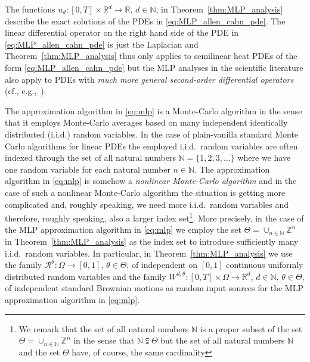 \documentclass[12pt,AutoFakeBold,AutoFakeSlant]{article}
\theoremstyle{definition}
\newcommand{\R}{\mathbb{R}}
\newcommand{\Z}{\mathbb{Z}}
\newcommand{\N}{\mathbb{N}}
\begin{document}
	The functions $ u_d \colon [0,T] \times \R^d \to \R $, $ d \in \N $, 
	in Theorem~\ref{thm:MLP_analysis} 
	describe the exact solutions of the PDEs in \eqref{eq:MLP_allen_cahn_pde}. 
	The linear differential operator on the 
	right hand side of the PDE in 
	\eqref{eq:MLP_allen_cahn_pde} 
	is just the Laplacian and 
	Theorem~\ref{thm:MLP_analysis} thus only applies to 
	semilinear heat PDEs of the form \eqref{eq:MLP_allen_cahn_pde} 
	but the MLP analyses in the scientific literature 
	also apply to PDEs with 
	\emph{much more general second-order differential operators} 
	(cf., e.g.,~\cite{hutzenthaler2020lipschitz,
	hutzenthaler2019arxiv1903}). 



	The approximation algorithm in \eqref{eq:mlp} is a Monte-Carlo algorithm in the sense 
	that it employs Monte-Carlo averages based on many independent identically distributed (i.i.d.) 
	random variables. In the case of plain-vanilla standard Monte Carlo algorithms 
	for linear PDEs the employed i.i.d.\ random variables are often indexed 
	through the set of all natural numbers $ \N = \{ 1, 2, 3, \dots \} $ 
	where we have one random variable for each natural number $ n \in \N $. 
	The approximation algorithm in \eqref{eq:mlp} is somehow a \emph{nonlinear Monte-Carlo algorithm} 
	and in the case of such a nonlinear Monte-Carlo algorithm the situation is getting more 
	complicated and, roughly speaking, we need more i.i.d.\ random variables and 
	therefore, roughly speaking, also a larger index set\footnote{We remark that the set of all natural numbers $ \N $ 
	is a proper subset of the set $ \Theta = \cup_{ n \in \N } \Z^n $ in the sense that $ \N \subsetneqq \Theta $ but 
	the set of all natural numbers $ \N $ 
	and the set $ \Theta $ have, of course, the same cardinality}. More precisely, 
	in the case of the MLP approximation algorithm in \eqref{eq:mlp} we employ the 
	set $ \Theta = \cup_{ n \in \N } \Z^n $ in Theorem~\ref{thm:MLP_analysis} 
	as the index set to introduce sufficiently many i.i.d.\ random variables. 
	In particular, in Theorem~\ref{thm:MLP_analysis} we use 
	the family $ \mathcal{R}^{ \theta } \colon \Omega \to [0,1] $,
	$ \theta \in \Theta $, of independent 
	on $ [0,1] $ continuous uniformly distributed random variables 
	and the family 
	$ W^{ d, \theta } \colon [0,T] \times \Omega \to \R^d $, 
	$ d \in \N $,
	$ \theta \in \Theta $, 
	of independent standard Brownian motions 
	as random input sources for the MLP approximation algorithm 
	in \eqref{eq:mlp}. 
\end{document}
